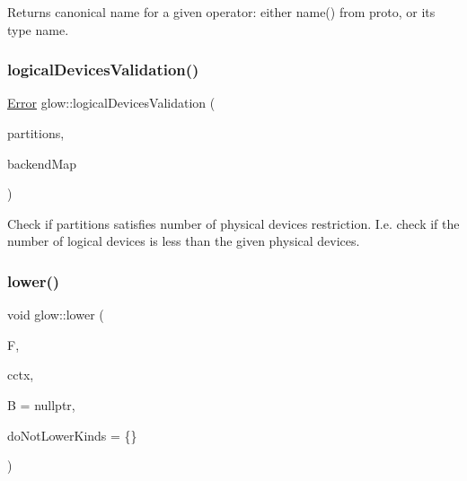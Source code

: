 Returns canonical name for a given operator\+: either {\ttfamily name()} from proto, or its type name. \mbox{\label{namespaceglow_a85a9500a329d096bf03201016353f1dd}} 
\subsubsection{\texorpdfstring{logical\+Devices\+Validation()}{logicalDevicesValidation()}}
{\footnotesize\ttfamily \hyperlink{namespaceglow_afdb176c3a672ef66db0ecfc19a8d39bf}{Error} glow\+::logical\+Devices\+Validation (\begin{DoxyParamCaption}\item[{const \hyperlink{classglow_1_1_node_to_function_map}{Node\+To\+Function\+Map} \&}]{partitions,  }\item[{const std\+::map$<$ std\+::string, \hyperlink{structglow_1_1_backend_info}{Backend\+Info} $>$ \&}]{backend\+Map }\end{DoxyParamCaption})}

Check if {\ttfamily partitions} satisfies number of physical devices restriction. I.\+e. check if the number of logical devices is less than the given physical devices. \mbox{\label{namespaceglow_a0069e8261c2e2ddf94d4697de80150ad}} 
\subsubsection{\texorpdfstring{lower()}{lower()}}
{\footnotesize\ttfamily void glow\+::lower (\begin{DoxyParamCaption}\item[{\hyperlink{classglow_1_1_function}{Function} $\ast$}]{F,  }\item[{\hyperlink{structglow_1_1_compilation_context}{Compilation\+Context} \&}]{cctx,  }\item[{const \hyperlink{classglow_1_1_backend}{Backend} $\ast$}]{B = {\ttfamily nullptr},  }\item[{const Kind\+Set \&}]{do\+Not\+Lower\+Kinds = {\ttfamily \{\}} }\end{DoxyParamCaption})}

